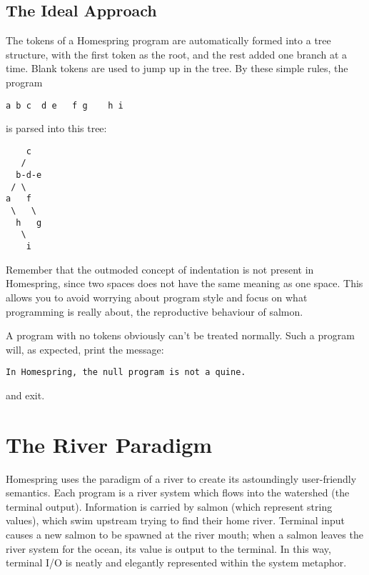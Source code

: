 \documentclass[10pt]{article}
\begin{document}
\subsection{The Ideal Approach}

The tokens of a Homespring program are automatically formed into a tree structure, with the first token as the root, and the rest added one branch at a time. Blank tokens are used to jump up in the tree. By these simple rules, the program
\begin{verbatim}
a b c  d e   f g    h i
\end{verbatim}
is parsed into this tree:

\begin{verbatim}
    c
   /
  b-d-e
 / \
a   f
 \   \
  h   g
   \
    i
\end{verbatim}

Remember that the outmoded concept of indentation is not present in Homespring, since two spaces does not have the same meaning as one space. This allows you to avoid worrying about program style and focus on what programming is really about, the reproductive behaviour of salmon.

A program with no tokens obviously can't be treated normally. Such a program will, as expected, print the message:
\begin{verbatim}
In Homespring, the null program is not a quine.
\end{verbatim}
and exit.

\section{The River Paradigm}

Homespring uses the paradigm of a river to create its astoundingly user-friendly semantics. Each program is a river system which flows into the watershed (the terminal output). Information is carried by salmon (which represent string values), which swim upstream trying to find their home river.
Terminal input causes a new salmon to be spawned at the river mouth; when a salmon leaves the river system for the ocean,
its value is output to the terminal. In this way, terminal I/O is neatly and elegantly represented within the system
metaphor.
\end{document}
